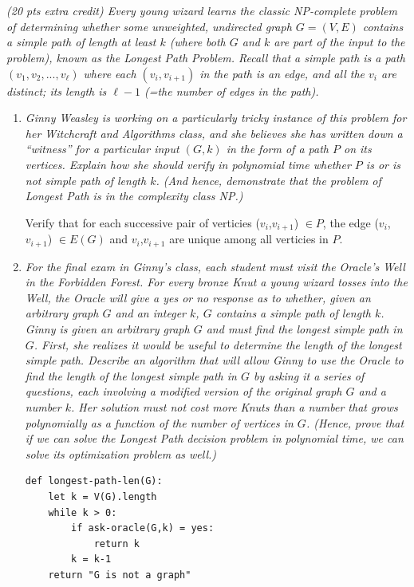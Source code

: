 \documentclass[12pt]{article} \setlength{\oddsidemargin}{0in}
\begin{document}
\section{}
\textit{(20 pts extra credit) Every young wizard learns the classic NP-complete problem of determining whether some unweighted, undirected graph $G = (V,E)$ contains a simple path of length at least $k$ (where both $G$ and $k$ are part of the input to the problem), known as the Longest Path Problem. Recall that a simple path is a path $(v_1, v_2, ... , v_\ell)$ where each $(v_i, v_{i+1})$ in the path is an edge, and all the $v_i$ are distinct; its length is $\ell-1$ (=the number of edges in the path).}
\begin{enumerate}
\item\textit{Ginny Weasley is working on a particularly tricky instance of this problem for her Witchcraft and Algorithms class, and she believes she has written down a ``witness'' for a particular input $(G, k)$ in the form of a path $P$ on its vertices. Explain how she should verify in polynomial time whether $P$ is or is not simple path of length  $k$. (And hence, demonstrate that the problem of Longest Path is in the complexity class NP.)}

Verify that for each successive pair of verticies ($v_i$,$v_{i+1}$) $\in P$, the edge ($v_i$,$v_{i+1}$) $\in E(G)$ and $v_i$,$v_{i+1}$ are unique among all verticies in $P$.

\item\textit{For the final exam in Ginny's class, each student must visit the Oracle's Well in the Forbidden Forest. For every bronze Knut a young wizard tosses into the Well, the Oracle will give a yes or no response as to whether, given an arbitrary graph $G$ and an integer $k$, $G$ contains a simple path of length  $k$. Ginny is given an arbitrary graph $G$ and must find the longest simple path in $G$. First, she realizes it would be useful to determine the length of the longest simple path. Describe an algorithm that will allow Ginny to use the Oracle to find the length of the longest simple path in $G$ by asking it a series of questions, each involving a modified version of the original graph $G$ and a number $k$. Her solution must not cost more Knuts than a number that grows polynomially as a function of the number of vertices in $G$. (Hence, prove that if we can solve the Longest Path decision problem in polynomial time, we can solve its optimization problem as well.)}

\begin{verbatim}
def longest-path-len(G):
    let k = V(G).length
    while k > 0:
        if ask-oracle(G,k) = yes:
            return k
        k = k-1
    return "G is not a graph"
\end{verbatim}


\end{enumerate}
\end{document}
